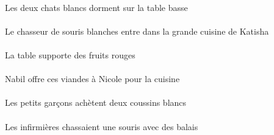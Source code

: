 \begin{exe}
\DEFDuAbsP{}   \blancDDuP{}   \chatDDuAbsP{}    \DEFSgOblP{}   \basDSgP{}   \tableDSgOblP{}   \SURP{}  \dormirViPrsDDuP{}\\
Les deux chats blancs dorment sur la table basse
\ex\gll
\DEFSgAbs{}    \INDPlObl{}   \blancBPl{}   \sourisBPlObl{}   \DE{}   \chasseurCSgAbs{}    \DEFSgObl{}    \INDSgObl{}   \KatishaASgObl{}   \DE{}   \grandDSg{}   \cuisineDSgObl{}   \DANS{}  \entrerViPrsCSg{}\\
\DEFSgAbsP{}    \INDPlOblP{}   \blancBPlP{}   \sourisBPlOblP{}   \DEP{}   \chasseurCSgAbsP{}    \DEFSgOblP{}    \INDSgOblP{}   \KatishaASgOblP{}   \DEP{}   \grandDSgP{}   \cuisineDSgOblP{}   \DANSP{}  \entrerViPrsCSgP{}\\
Le chasseur de souris blanches entre dans la grande cuisine de Katisha
\ex\gll
\DEFSgErg{}   \tableDSgErg{}   \INDPlAbs{}   \rougeAPl{}   \fruitAPlAbs{}  \supporterVtPrsAPl{}\\
\DEFSgErgP{}   \tableDSgErgP{}   \INDPlAbsP{}   \rougeAPlP{}   \fruitAPlAbsP{}  \supporterVtPrsAPlP{}\\
La table supporte des fruits rouges
\ex\gll
\DEFSgObl{}   \cuisineDSgObl{}   \POUR{}   \INDSgErg{}   \NabilDSgErg{}    \INDSgDat{}   \NicoleBSgDat{}   \DEMPlAbs{}   \viandeAPlAbs{}  \offrirVdPrsAPl{}\\
\DEFSgOblP{}   \cuisineDSgOblP{}   \POURP{}   \INDSgErgP{}   \NabilDSgErgP{}    \INDSgDatP{}   \NicoleBSgDatP{}   \DEMPlAbsP{}   \viandeAPlAbsP{}  \offrirVdPrsAPlP{}\\
Nabil offre ces viandes à Nicole pour la cuisine
\ex\gll
\DEFPlErg{}   \petitDPl{}   \garconDPlErg{}   \INDDuAbs{}   \blancBDu{}   \coussinBDuAbs{}  \acheterVtPrsBDu{}\\
\DEFPlErgP{}   \petitDPlP{}   \garconDPlErgP{}   \INDDuAbsP{}   \blancBDuP{}   \coussinBDuAbsP{}  \acheterVtPrsBDuP{}\\
Les petits garçons achètent deux coussins blancs
\ex\gll
\DEFPlErg{}   \infirmiereAPlErg{}    \INDPlObl{}   \balaiAPlObl{}   \AVEC{}   \INDSgAbs{}   \sourisBSgAbs{}  \chasserVtPstBSg{}\\
\DEFPlErgP{}   \infirmiereAPlErgP{}    \INDPlOblP{}   \balaiAPlOblP{}   \AVECP{}   \INDSgAbsP{}   \sourisBSgAbsP{}  \chasserVtPstBSgP{}\\
Les infirmières chassaient une souris avec des balais
\ex\gll
\DEMPlAbs{}   \autrucheBPlAbs{}    \DEFSgObl{}    \INDSgObl{}   \NabilDSgObl{}   \DE{}   \villageCSgObl{}   \DANS{}  \arriverViPrsBPl{}\\
\DEMPlAbsP{}   \autrucheBPlAbsP{}    \DEFSgOblP{}    \INDSgOblP{}   \NabilDSgOblP{}   \DEP{}   \villageCSgOblP{}   \DANSP{}  \arriverViPrsBPlP{}\\

\end{exe}

